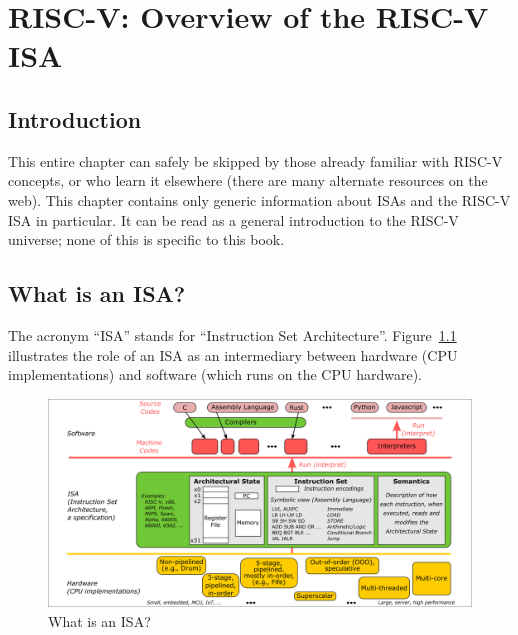 

\chapter{RISC-V: Overview of the RISC-V ISA}



\setcounter{page}{1}
\renewcommand{\thepage}{\arabic{chapter}-\arabic{page}}

\label{ch_ISA}


\section{Introduction}

This entire chapter can safely be skipped by those already familiar
with RISC-V concepts, or who learn it elsewhere (there are many
alternate resources on the web).  This chapter contains only generic
information about ISAs and the RISC-V ISA in particular.  It can be
read as a general introduction to the RISC-V universe; none of this is
specific to this book.


\section{What is an ISA?}


The acronym ``ISA'' stands for ``Instruction Set Architecture''.
Figure~\ref{Fig_What_is_an_ISA} illustrates the role of an ISA as an
intermediary between hardware (CPU implementations) and software
(which runs on the CPU hardware).
\begin{figure}[htbp]
  \centerline{\includegraphics[width=6in,angle=0]{Figures/Fig_What_is_an_ISA}}
  \caption{\label{Fig_What_is_an_ISA} What is an ISA?}
\end{figure}

